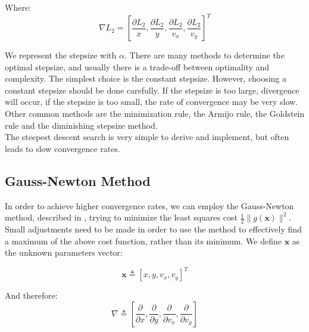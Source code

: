 Where:
\begin{equation}
 \nabla L_2  = [\frac{\partial L_2}{x},\frac{\partial L_2}{y},\frac{\partial L_2}{v_x},\frac{\partial L_2}{v_y}]^T 
\end{equation}

We represent the stepsize with $\alpha$. There are many methods to determine the optimal stepsize, and usually there is a trade-off between optimality and complexity. The simplest choice is the constant stepsize. However, choosing a constant stepsize should be done carefully. If the stepsize is too large, divergence will occur, if the stepsize is too small, the rate of convergence may be very slow. Other common methods are the minimization rule, the Armijo rule, the Goldstein rule and the diminishing stepsize method. \\
The steepest descent search is very simple to derive and implement, but often leads to slow convergence rates.\\

\subsection{Gauss-Newton Method}
In order to achieve higher convergence rates, we can employ the Gauss-Newton method, described in \cite{gauss_newton_method}, trying to minimize the least squares cost $\frac{1}{2}\|g(\mathbf{x})\|^2$. 
Small adjustments need to be made in order to use the method to effectively find a maximum of the above cost function, rather than its minimum.
We define $\mathbf{x}$ as the unknown parameters vector:

\begin{equation*}
\mathbf{x} \triangleq \left[ x,y,v_x,v_y \right]^T
\end{equation*}

And therefore:
\begin{equation*}
\nabla \triangleq \left[\frac{\partial}{\partial x}, \frac{\partial}{\partial y}, \frac{\partial}{\partial v_x},
\frac{\partial}{\partial v_y}\right]
\end{equation*}

